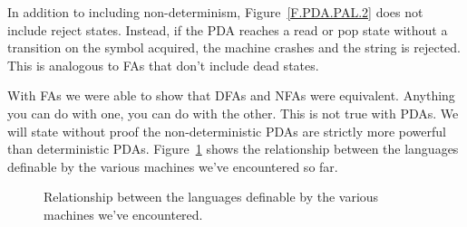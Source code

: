 \documentclass[letterpaper,12pt,openany,reqno]{book}%
\begin{document}
In addition to including non-determinism, Figure~\ref{F.PDA.PAL.2} does not include reject states. Instead, if the PDA reaches a read or pop state without a transition on the symbol acquired, the machine crashes and the string is rejected. This is analogous to FAs that don't include dead states. 

With FAs we were able to show that DFAs and NFAs were equivalent. Anything you can do with one, you can do with the other. This is not true with PDAs. We will state without proof the non-deterministic PDAs are strictly more powerful than deterministic PDAs. Figure~\ref{F.machine.sizes.1} shows the relationship between the languages definable by the various machines we've encountered so far.
\begin{figure}[htbp]
\centering
{} %
\caption{Relationship between the languages definable by the various machines we've encountered.}
\label{F.machine.sizes.1}
\end{figure}
\end{document}

